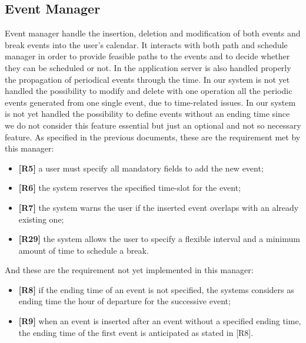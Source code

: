 \subsection{Event Manager}
Event manager handle the insertion, deletion and modification of both events and break events into the user's calendar.
It interacts with both path and schedule manager in order to provide feasible paths to the events and to decide whether they can be scheduled or not.
In the application server is also handled properly the propagation of periodical events through the time.
In our system is not yet handled the possibility to modify and delete with one operation all the periodic events generated from one single event, due to time-related issues.
In our system is not yet handled the possibility to define events without an ending time since we do not consider this feature essential but just an optional and not so necessary feature. 
As specified in the previous documents, these are the requirement met by this manager:
\begin{itemize}
	\item \textbf{[R5]} a user must specify all mandatory fields to add the new event;
	\item \textbf{[R6]} the system reserves the specified time-slot for the event;
	\item \textbf{[R7]} the system warns the user if the inserted event overlaps with an already existing one;
	\item \textbf{[R29]} the system allows the user to specify a flexible interval and a minimum amount of time to schedule a break.
\end{itemize}
And these are the requirement not yet implemented in this manager:
\begin{itemize}
	\item \textbf{[R8]} if the ending time of an event is not specified, the systems considers as ending time the hour of departure for the successive event;
	\item \textbf{[R9]} when an event is inserted after an event without a specified ending time, the ending time  of the first event is anticipated as stated in [R8].
\end{itemize}

